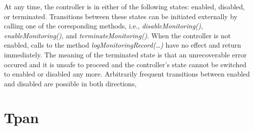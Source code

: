 \documentclass[12pt,journal,a4paper,twocolumn,final,oneside]{IEEEtran}%
\begin{document}

At any time, the controller is in either of the following states: %
enabled, disabled, or terminated. Transitions between these states can be %
initiated externally by calling one of the coresponding methods, i.e., %
\textit{disableMonitoring()}, \textit{enableMonitoring()}, and %
\textit{terminateMonitoring()}. When the controller is not enabled, calls to %
the method \textit{logMonitoringRecord(\dots)} have no effect and return %
immediately. The meaning of the terminated state is that an unrecoverable error %
occured and it is unsafe to proceed and the controller's state cannot be switched %
to enabled or disabled any more. Arbitrarily frequent transitions between enabled %
and disabled are possible in both directions, 

% 
% 

\section{Tpan}

% 

% 
% 
\end{document}
